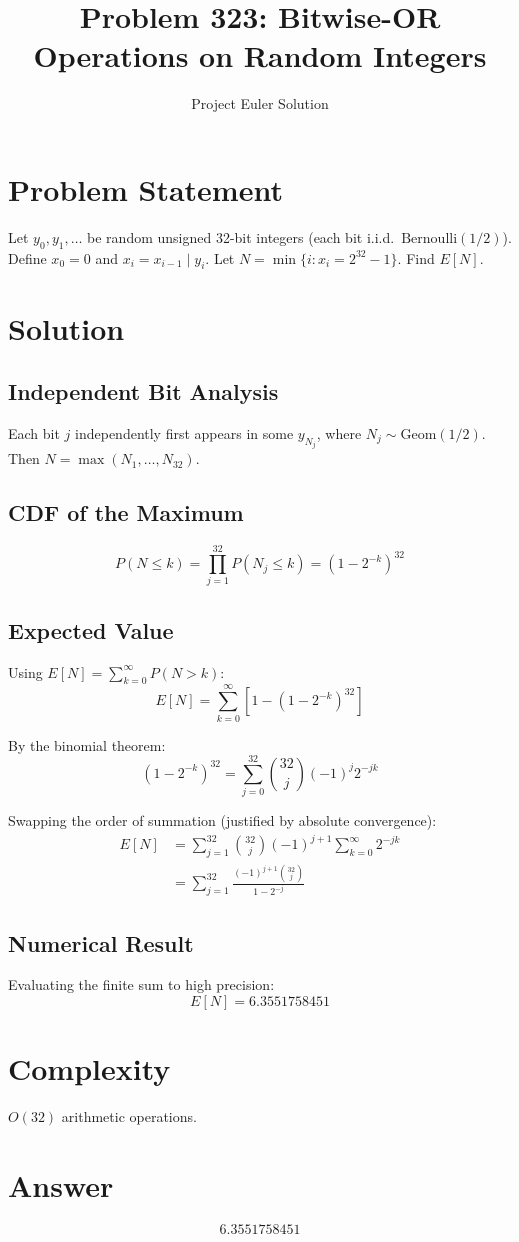 \documentclass[12pt]{article}
\title{Problem 323: Bitwise-OR Operations on Random Integers}
\author{Project Euler Solution}
\date{}
\begin{document}
\maketitle

\section{Problem Statement}
Let $y_0, y_1, \ldots$ be random unsigned 32-bit integers (each bit i.i.d.\ $\mathrm{Bernoulli}(1/2)$). Define $x_0 = 0$ and $x_i = x_{i-1} \mathbin{|} y_i$. Let $N = \min\{i : x_i = 2^{32}-1\}$. Find $E[N]$.

\section{Solution}

\subsection{Independent Bit Analysis}
Each bit $j$ independently first appears in some $y_{N_j}$, where $N_j \sim \mathrm{Geom}(1/2)$. Then $N = \max(N_1, \ldots, N_{32})$.

\subsection{CDF of the Maximum}
\[
P(N \le k) = \prod_{j=1}^{32} P(N_j \le k) = \left(1 - 2^{-k}\right)^{32}
\]

\subsection{Expected Value}
Using $E[N] = \sum_{k=0}^{\infty} P(N > k)$:
\[
E[N] = \sum_{k=0}^{\infty} \left[1 - \left(1 - 2^{-k}\right)^{32}\right]
\]

By the binomial theorem:
\[
\left(1-2^{-k}\right)^{32} = \sum_{j=0}^{32} \binom{32}{j}(-1)^j 2^{-jk}
\]

Swapping the order of summation (justified by absolute convergence):
\begin{align}
E[N] &= \sum_{j=1}^{32} \binom{32}{j} (-1)^{j+1} \sum_{k=0}^{\infty} 2^{-jk} \\
     &= \sum_{j=1}^{32} \frac{(-1)^{j+1} \binom{32}{j}}{1 - 2^{-j}}
\end{align}

\subsection{Numerical Result}
Evaluating the finite sum to high precision:
\[
E[N] = \boxed{6.3551758451}
\]

\section{Complexity}
$O(32)$ arithmetic operations.

\section{Answer}

\[
\boxed{6.3551758451}
\]
\end{document}
